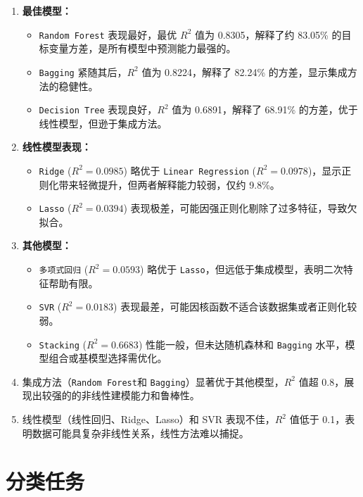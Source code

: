 \documentclass[12pt, a4paper, oneside]{ctexart}
\begin{document}
\begin{enumerate}
    \item \textbf{最佳模型：}
    \begin{itemize}
        \item \texttt{Random Forest} 表现最好，最优 $R^2$ 值为 0.8305，解释了约 83.05\% 的目标变量方差，是所有模型中预测能力最强的。
        \item \texttt{Bagging} 紧随其后，$R^2$ 值为 0.8224，解释了 82.24\% 的方差，显示集成方法的稳健性。
        \item \texttt{Decision Tree} 表现良好，$R^2$ 值为 0.6891，解释了 68.91\% 的方差，优于线性模型，但逊于集成方法。
    \end{itemize}
    \item \textbf{线性模型表现：}
    \begin{itemize}
        \item \texttt{Ridge} ($R^2 = 0.0985$) 略优于 \texttt{Linear Regression} ($R^2 = 0.0978$)，显示正则化带来轻微提升，但两者解释能力较弱，仅约 9.8\%。
        \item \texttt{Lasso} ($R^2 = 0.0394$) 表现极差，可能因强正则化剔除了过多特征，导致欠拟合。
    \end{itemize}
    \item \textbf{其他模型：}
    \begin{itemize}
        \item \texttt{多项式回归} ($R^2 = 0.0593$) 略优于 \texttt{Lasso}，但远低于集成模型，表明二次特征帮助有限。
        \item \texttt{SVR} ($R^2 = 0.0183$) 表现最差，可能因核函数不适合该数据集或者正则化较弱。
        \item \texttt{Stacking} ($R^2 = 0.6683$) 性能一般，但未达随机森林和 \texttt{Bagging} 水平，模型组合或基模型选择需优化。
    \end{itemize}
    \item 集成方法（\texttt{Random Forest}和 \texttt{Bagging}）显著优于其他模型，$R^2$ 值超 0.8，展现出较强的的非线性建模能力和鲁棒性。
    \item 线性模型（线性回归、Ridge、Lasso）和 SVR 表现不佳，$R^2$ 值低于 0.1，表明数据可能具复杂非线性关系，线性方法难以捕捉。
\end{enumerate}




\section{分类任务}
\end{document}
